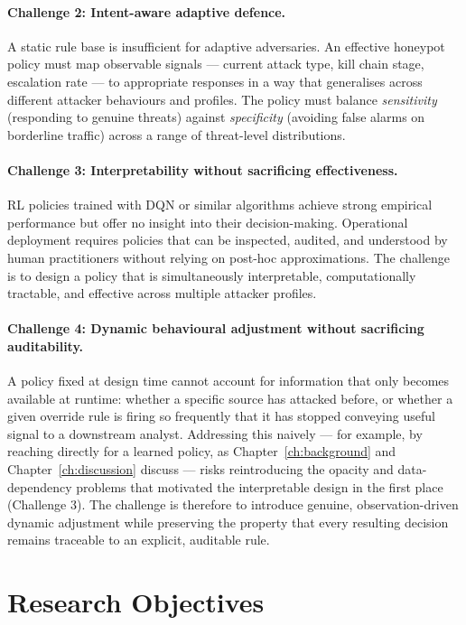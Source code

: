 \paragraph{Challenge 2: Intent-aware adaptive defence.}
A static rule base is insufficient for adaptive adversaries.
An effective honeypot policy must map observable signals --- current attack
type, kill chain stage, escalation rate --- to appropriate responses in a
way that generalises across different attacker behaviours and profiles.
The policy must balance \emph{sensitivity} (responding to genuine threats)
against \emph{specificity} (avoiding false alarms on borderline traffic)
across a range of threat-level distributions.

\paragraph{Challenge 3: Interpretability without sacrificing effectiveness.}
RL policies trained with DQN or similar algorithms achieve strong empirical
performance but offer no insight into their decision-making.
Operational deployment requires policies that can be inspected, audited, and
understood by human practitioners without relying on post-hoc approximations.
The challenge is to design a policy that is simultaneously interpretable,
computationally tractable, and effective across multiple attacker profiles.

\paragraph{Challenge 4: Dynamic behavioural adjustment without sacrificing
auditability.}
A policy fixed at design time cannot account for information that only
becomes available at runtime: whether a specific source has attacked before,
or whether a given override rule is firing so frequently that it has stopped
conveying useful signal to a downstream analyst.
Addressing this naively --- for example, by reaching directly for a learned
policy, as Chapter~\ref{ch:background} and Chapter~\ref{ch:discussion}
discuss --- risks reintroducing the opacity and data-dependency problems
that motivated the interpretable design in the first place (Challenge 3).
The challenge is therefore to introduce genuine, observation-driven dynamic
adjustment while preserving the property that every resulting decision
remains traceable to an explicit, auditable rule.

\section{Research Objectives}

